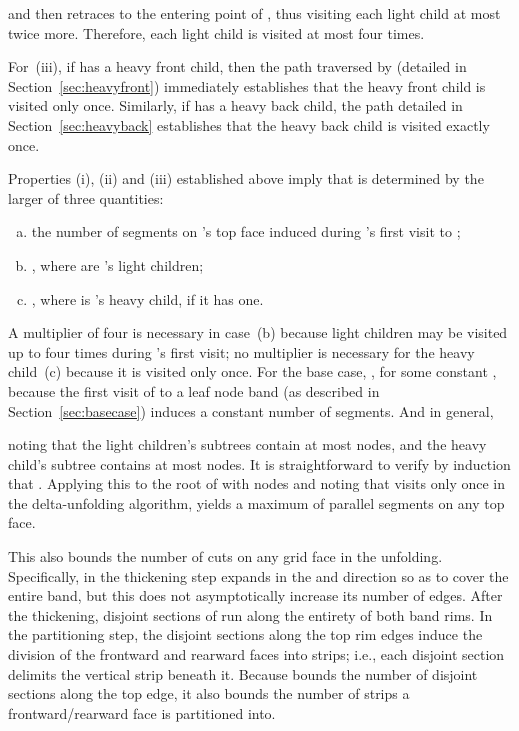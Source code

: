 \documentclass[11pt]{article}
\begin{document}
and then retraces
 to the entering point of , thus visiting each light child
at most twice more. Therefore,
each light child is visited at most four times.


For~(iii), if  has a heavy front child, then the path traversed by 
(detailed in Section~\ref{sec:heavyfront}) immediately establishes that the heavy front
child is visited only once. Similarly, if  has a heavy back child, the path detailed
in Section~\ref{sec:heavyback} establishes that the heavy back child is visited exactly once.


Properties (i), (ii) and (iii) established above imply that  is determined
by the larger of three quantities:
\begin{enumerate}[(a)]
\item the number of  segments on 's top face induced during 's
first visit to ;
\item , where  are 's
light
children;
\item , where  is 's heavy child, if it has one.
\end{enumerate}
A multiplier of four is necessary in case~(b) because light children may be visited up to four times during 's first visit; no multiplier is
necessary for the heavy child~(c) because it is visited only once. For the base case,
, for some constant , because the first visit of  to
a leaf node band (as described in Section~\ref{sec:basecase}) induces a constant
number of  segments.
And in general,

noting that the light children's subtrees contain at most  nodes,
and the heavy child's subtree contains at most  nodes. It is
straightforward to verify by induction that .
Applying this to the root  of  with  nodes
and noting that  visits  only once in the delta-unfolding
algorithm,
yields a maximum of   parallel segments on any top face.

This also bounds the number of cuts on any grid face in the unfolding.
Specifically, in the thickening step  expands in the  and 
direction so as to cover the entire band, but this does not asymptotically
increase its number of edges.
After the thickening, disjoint sections of
 run along the entirety of both band rims. In the partitioning
step, the disjoint sections along the top rim edges
induce the division of the frontward and rearward faces into strips;
i.e., each disjoint section delimits the vertical strip beneath it. Because 
bounds the number of disjoint sections along the top edge, it also bounds the number of strips
a frontward/rearward face is partitioned into.
\end{document}
